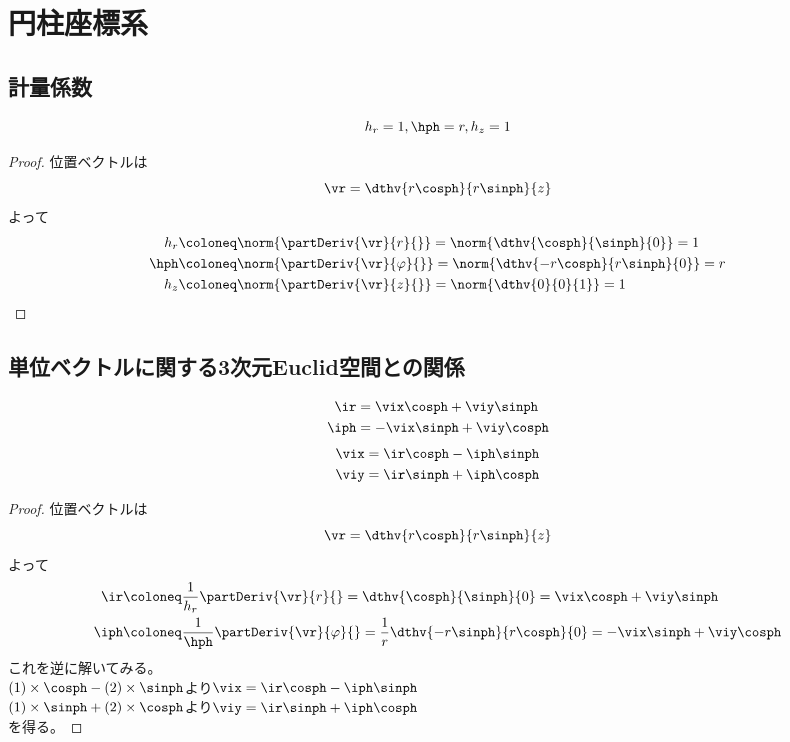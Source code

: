 \chapter{円柱座標系}
    \section{計量係数}
        \begin{shadebox}
            \[h_r = 1, \hph = r, h_z = 1\]
        \end{shadebox}
        \begin{proof}
            位置ベクトルは
            \[\vr = \dthv{r\cosph}{r\sinph}{z}\]
            よって
            \begin{align*}
                h_r &\coloneq \norm{\partDeriv{\vr}{r}{}} = \norm{\dthv{\cosph}{\sinph}{0}} = 1\\
                \hph &\coloneq \norm{\partDeriv{\vr}{\varphi}{}} = \norm{\dthv{-r\cosph}{r\sinph}{0}} = r\\
                h_z &\coloneq \norm{\partDeriv{\vr}{z}{}} = \norm{\dthv{0}{0}{1}} = 1
            \end{align*}
        \end{proof}
    \section{単位ベクトルに関する3次元Euclid空間との関係}
        \begin{shadebox}
            \begin{align*}
                \ir &= \vix\cosph + \viy\sinph\\
                \iph &= -\vix\sinph + \viy\cosph
            \end{align*}
            \begin{align*}
                \vix &= \ir\cosph - \iph\sinph\\
                \viy &= \ir\sinph + \iph\cosph
            \end{align*}
        \end{shadebox}
        \begin{proof}
            位置ベクトルは
            \[\vr = \dthv{r\cosph}{r\sinph}{z}\]
            よって
            \begin{align}
                \ir &\coloneq \frac{1}{h_r}\partDeriv{\vr}{r}{} = \dthv{\cosph}{\sinph}{0} = \vix\cosph+\viy\sinph \\
                \iph &\coloneq \frac{1}{\hph}\partDeriv{\vr}{\varphi}{} = \frac{1}{r}\dthv{-r\sinph}{r\cosph}{0} = -\vix\sinph+\viy\cosph
            \end{align}
            これを逆に解いてみる。\\
            $(1)\times\cosph-(2)\times\sinph$より$\vix = \ir\cosph - \iph\sinph$\\
            $(1)\times\sinph+(2)\times\cosph$より$\viy = \ir\sinph + \iph\cosph$\\
            を得る。
        \end{proof}
